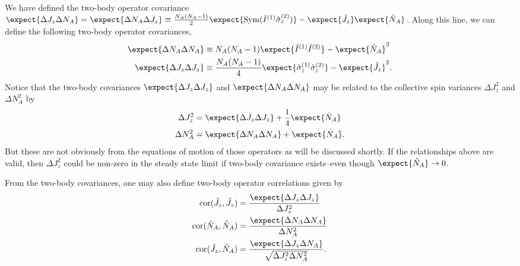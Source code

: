 We have defined the two-body operator covariance $ \expect{\Delta J_z \Delta N_A}=\expect{\Delta N_A\Delta J_z}\equiv  \frac{N_A(N_A-1)}{2}\expect{\mathrm{Sym}(\hat{I}^{(1)}\hat{\sigma}_z^{(2)} ) } - \expect{\hat{J}_z }\expect{\hat{N}_A}$. Along this line, we can define the following two-body operator covariances,
\begin{align}
\expect{\Delta N_A \Delta N_A} &\equiv N_A(N_A-1)\expect{\hat{I}^{(1)}\hat{I}^{(2)} } - \expect{\hat{N}_A}^2\\
\expect{\Delta J_z \Delta J_z} &\equiv \frac{N_A(N_A-1)}{4}\expect{\hat{\sigma}_z^{(1)}\hat{\sigma}_z^{(2)} } - \expect{\hat{J}_z }^2.
\end{align}
Notice that the two-body covariances $ \expect{\Delta J_z \Delta J_z} $ and $ \expect{\Delta N_A \Delta N_A} $ may be related to the collective spin variances $ \Delta J_z^2 $ and $\Delta N_A^2 $ by
\begin{align}
\Delta J_z^2 &= \expect{\Delta J_z \Delta J_z} + \frac{1}{4} \expect{\hat{N}_A}\\
\Delta N_A^2 &= \expect{\Delta N_A \Delta N_A} + \expect{\hat{N}_A}.
\end{align}
But these are not obviously from the equations of motion of those operators as will be discussed shortly.
If the relationships above are valid, then $ \Delta J_z^2 $ could be non-zero in the steady state limit if two-body covariance exists--even though $\expect{\hat{N}_A}\rightarrow 0  $.  

From the two-body covariances, one may also define two-body operator correlations given by
\begin{align}
\mathrm{cor}(\hat{J}_z,\hat{J}_z) &= \frac{\expect{\Delta J_z \Delta J_z}}{\Delta J_z^2}\\
\mathrm{cor}(\hat{N}_A,\hat{N}_A) &= \frac{\expect{\Delta N_A \Delta N_A}}{\Delta N_A^2}\\
\mathrm{cor}(\hat{J}_z,\hat{N}_A) &= \frac{\expect{\Delta J_z \Delta N_A}}{\sqrt{\Delta J_z^2\Delta N_A^2}}.
\end{align}

